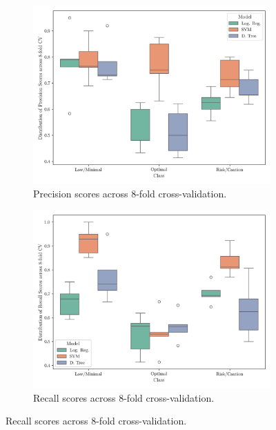 \documentclass[conference]{IEEEtran}
\begin{document}
\begin{figure}[H]
    \centering
    \begin{subfigure}[1]{\linewidth}
        \centering
        \includegraphics[width=1\linewidth]{assets/box_precision.png}
        \caption{Precision scores across 8-fold cross-validation.}
        \label{box_precision}
    \end{subfigure}
    
    \vspace{0.5cm}

    \begin{subfigure}[1]{\linewidth}
        \centering
        \includegraphics[width=1\linewidth]{assets/box_recall.png}
        \caption{Recall scores across 8-fold cross-validation.}
        \label{box_recall}
    \end{subfigure}


\end{figure}
\end{document}
